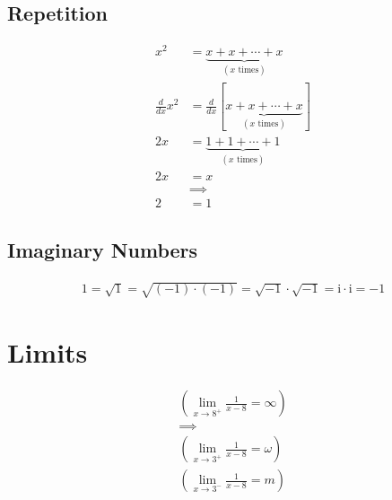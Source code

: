 \documentclass{article}
\newcommand{\iu}{\mathrm{i}} %
\begin{document}
\subsection{Repetition}

\begin{equation}
	\begin{split}
		x^2& = \underbrace{x+x+\cdots+x}_{(x\text{ times})} \\
		\frac{d}{dx}x^2& = \frac{d}{dx}[\underbrace{x+x+\cdots+x}_{(x\text{ times})}] \\
		2x& = \underbrace{1+1+\cdots+1}_{(x\text{ times})} \\
		2x& = x \\
		& \implies \\
		2& = 1
	\end{split}
\end{equation}

\subsection{Imaginary Numbers}

\begin{equation}
	\begin{split}
		1 = \sqrt{1} = \sqrt{(-1)\cdot(-1)} = \sqrt{-1}\cdot \sqrt{-1} = \iu \cdot \iu = -1
	\end{split}
\end{equation}

\section{Limits}

\begin{equation}
	\begin{split}
		(\lim_{x\to8^+}\frac{1}{x-8} = \infty) \\
		\implies \\
		(\lim_{x\to3^+}\frac{1}{x-8} = \omega) \\
		(\lim_{x\to3^-}\frac{1}{x-8} = m)
	\end{split}
\end{equation}

\nocite{*}
\printbibliography[heading=bibintoc]
\end{document}

